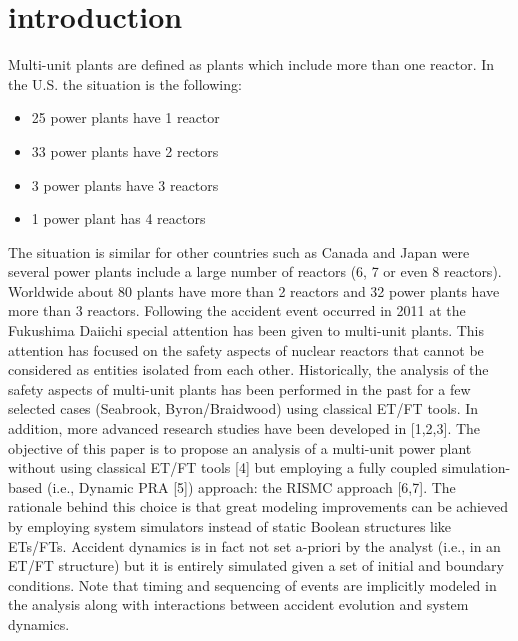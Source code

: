 \section{introduction}
\label{sec:introduction}

Multi-unit plants are defined as plants which include more than one reactor. 
In the U.S. the situation is the following:
\begin{itemize}
  \item 25 power plants have 1 reactor
  \item 33 power plants have 2 rectors
  \item 3 power plants have 3 reactors
  \item 1 power plant has 4 reactors
\end{itemize}
The situation is similar for other countries such as Canada and Japan were 
several power plants include a large number of reactors (6, 7 or even 8 reactors). 
Worldwide about 80 plants have more than 2 reactors and 32 power plants have more than 3 reactors. 
Following the accident event occurred in 2011 at the Fukushima Daiichi special 
attention has been given to multi-unit plants. This attention has focused on the 
safety aspects of nuclear reactors that cannot be considered as entities isolated from each other. 
Historically, the analysis of the safety aspects of multi-unit plants has been performed 
in the past for a few selected cases (Seabrook, Byron/Braidwood) using classical ET/FT tools. 
In addition, more advanced research studies have been developed in [1,2,3]. 
The objective of this paper is to propose an analysis of a multi-unit power plant without 
using classical ET/FT tools [4] but employing a fully coupled simulation-based 
(i.e., Dynamic PRA [5]) approach: the RISMC approach [6,7]. The rationale behind this choice 
is that great modeling improvements can be achieved by employing system simulators instead 
of static Boolean structures like ETs/FTs. 
Accident dynamics is in fact not set a-priori by the analyst (i.e., in an ET/FT structure) 
but it is entirely simulated given a set of initial and boundary conditions. Note that timing and 
sequencing of events are implicitly modeled in the analysis along with interactions between 
accident evolution and system dynamics.
